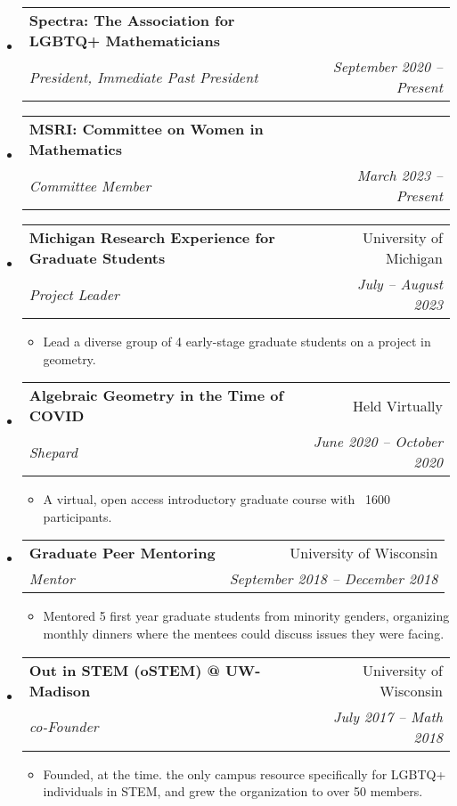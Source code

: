 \documentclass[letterpaper,12pt]{article}
\makeatletter
\newcommand{\resitem}[1]{\item #1 \vspace{-2pt}}
\newcommand{\ressubheading}[4]{
\begin{tabular*}{6.5in}[t]{l@{\cftdotfill{\cftsecdotsep}\extracolsep{\fill}}r}
		\textbf{#1} & #2 \\
		\textit{#3} & \textit{#4} \\
\end{tabular*}\vspace{-6pt}}
\makeatother
\begin{document}
\begin{itemize}
\item 
	\ressubheading{Spectra: The Association for LGBTQ+ Mathematicians }{}{President, Immediate Past President}{September 2020 -- Present}
	
\item 
	\ressubheading{MSRI: Committee on Women in Mathematics }{}{Committee Member}{March 2023 -- Present}
	
%
%
\item 
	\ressubheading{Michigan Research Experience for Graduate Students }{University of Michigan}{Project Leader}{July -- August 2023}
	\begin{itemize}
		\resitem{Lead a diverse group of 4 early-stage graduate students on a project in geometry.}
	\end{itemize}
	
\item 
	\ressubheading{Algebraic Geometry in the Time of COVID}{Held Virtually}{Shepard}{June 2020 -- October 2020}
	\begin{itemize}
		\resitem{A virtual, open access introductory graduate course with ~1600 participants.}
	\end{itemize}
		
%
%
%	

\item 
	\ressubheading{Graduate Peer Mentoring}{University of Wisconsin}{Mentor}{September 2018 -- December 2018}
	\begin{itemize}
		\resitem{Mentored 5 first year graduate students from minority genders, organizing monthly dinners where the mentees could discuss issues they were facing.}
	\end{itemize}
		
\item 
	\ressubheading{Out in STEM (oSTEM) @ UW-Madison}{University of Wisconsin}{co-Founder}{July 2017 -- Math 2018}
	\begin{itemize}
		\resitem{Founded, at the time. the only campus resource specifically for LGBTQ+ individuals in STEM, and grew the organization to over 50 members.}
\end{itemize}

\end{itemize}
\end{document}
